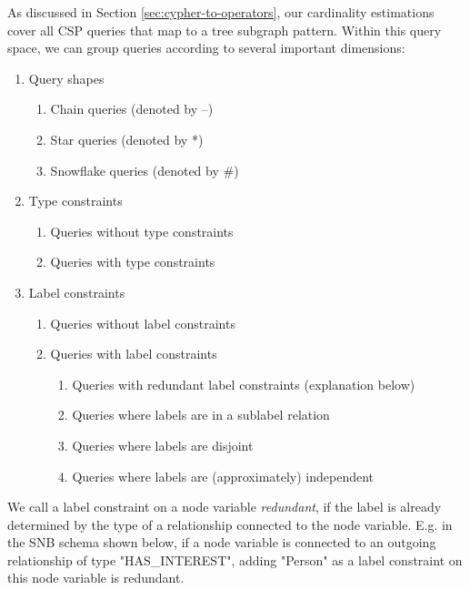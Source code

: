 As discussed in Section \ref{sec:cypher-to-operators}, our cardinality
estimations cover all CSP queries that map to a tree subgraph pattern.
Within this query space, we can group queries according to several
important dimensions:
\begin{samepage}
\begin{enumerate}
  \renewcommand{\labelenumii}{\theenumii}
  \renewcommand{\theenumii}{\theenumi.\arabic{enumii}.}
  \renewcommand{\theenumiii}{\theenumii\arabic{enumiii}}
  
  \item Query shapes
    \begin{enumerate}
      \item Chain queries (denoted by --)
      \item Star queries (denoted by *)
      \item Snowflake queries (denoted by \#)
    \end{enumerate}
  \item Type constraints
    \begin{enumerate}
      \item Queries without type constraints
      \item Queries with type constraints
    \end{enumerate}
  \item Label constraints
    \begin{enumerate}
      \item Queries without label constraints
      \item Queries with label constraints
      \begin{enumerate}
        \item Queries with redundant label constraints (explanation below)
        \item Queries where labels are in a sublabel relation
        \item Queries where labels are disjoint
        \item Queries where labels are (approximately) independent
      \end{enumerate}
    \end{enumerate}
\end{enumerate}
\end{samepage}

We call a label constraint on a node variable \emph{redundant}, if the label is
already determined by the type of a relationship connected to the node
variable.
E.g. in the SNB schema shown below, if a node variable is connected to an
outgoing relationship of type "HAS\_INTEREST", adding "Person" as a label
constraint on this node variable is redundant.


